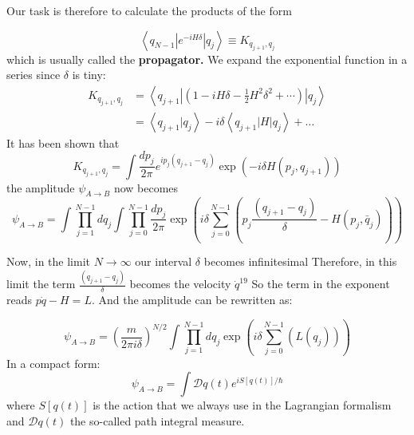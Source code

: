 Our task is therefore to calculate the products of the form
\begin{qt}
\begin{equation}
\left\langle q_{N-1}\left|e^{-i H \delta}\right| q_{j}\right\rangle \equiv K_{q_{j+1}, q_{j}}
\end{equation}
which is usually called the\textbf{ propagator.} We expand the exponential function in a series since $\delta$ is tiny:
\begin{equation}
\begin{aligned}
K_{q_{j+1}, q_{j}} &=\left\langle q_{j+1}\left|\left(1-i H \delta-\frac{1}{2} H^{2} \delta^{2}+\cdots\right)\right| q_{j}\right\rangle \\
&=\left\langle q_{j+1} | q_{j}\right\rangle- i \delta\left\langle q_{j+1}|H| q_{j}\right\rangle+\ldots
\end{aligned}
\end{equation}
It has been shown that 
\begin{equation}
K_{q_{j+1}, q_{j}}=\int \frac{d p_{j}}{2 \pi} e^{i p_{j}\left(q_{j+1}-q_{j}\right)} \exp \left(-i \delta H\left(p_{j}, q_{j+1}\right)\right)
\end{equation}
the amplitude $\psi_{A \rightarrow B}$ now becomes
\begin{equation}
\psi_{A \rightarrow B}=\int \prod_{j=1}^{N-1} d q_{j} \int \prod_{j=0}^{N-1} \frac{d p_{j}}{2 \pi} \exp \left(i \delta \sum_{j=0}^{N-1}\left(p_{j} \frac{\left(q_{j+1}-q_{j}\right)}{\delta}-H\left(p_{j}, \bar{q}_{j}\right)\right)\right)
\end{equation}
\end{qt}
Now, in the limit $N \rightarrow \infty$ our interval $\delta$ becomes infinitesimal Therefore, in this limit the term $\frac{\left(q_{j+1}-q_{j}\right)}{\delta}$ becomes the velocity $\dot{q}^{19}$ So the term in the exponent reads $p \dot{q}-H=L.$ And the amplitude can be rewritten as:
\begin{qt}
\begin{equation}
\psi_{A \rightarrow B}=\left(\frac{m}{2 \pi i \delta}\right)^{N / 2} \int \prod_{j=1}^{N-1} d q_{j} \exp \left(i \delta \sum_{j=0}^{N-1}\left(L\left(q_{j}\right)\right)\right)
\end{equation}
In a compact form:
\begin{equation}
\psi_{A \rightarrow B}=\int \mathcal{D} q(t) e^{i S[q(t)] / \hbar}
\end{equation}
where $S[q(t)]$ is the action that we always use in the Lagrangian formalism and $\mathcal{D} q(t)$ the so-called path integral measure.
\end{qt}


